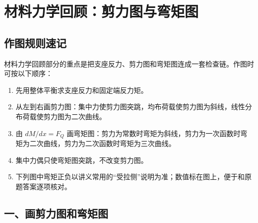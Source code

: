 \chapter{材料力学回顾：剪力图与弯矩图}

\section*{作图规则速记}

\begin{notecard}
材料力学回顾部分的重点是把支座反力、剪力图和弯矩图连成一套检查链。作图时可按以下顺序：
\begin{enumerate}
  \item 先用整体平衡求支座反力和固定端反力矩。
  \item 从左到右画剪力图：集中力使剪力图突跳，均布荷载使剪力图为斜线，线性分布荷载使剪力图为二次曲线。
  \item 由 \(dM/dx=F_Q\) 画弯矩图：剪力为常数时弯矩为斜线，剪力为一次函数时弯矩为二次曲线，剪力为二次函数时弯矩为三次曲线。
  \item 集中力偶只使弯矩图突跳，不改变剪力图。
  \item 下列图中弯矩正负以讲义常用的“受拉侧”说明为准；数值标在图上，便于和原题答案逐项核对。
\end{enumerate}
\end{notecard}

\section{一、画剪力图和弯矩图}

